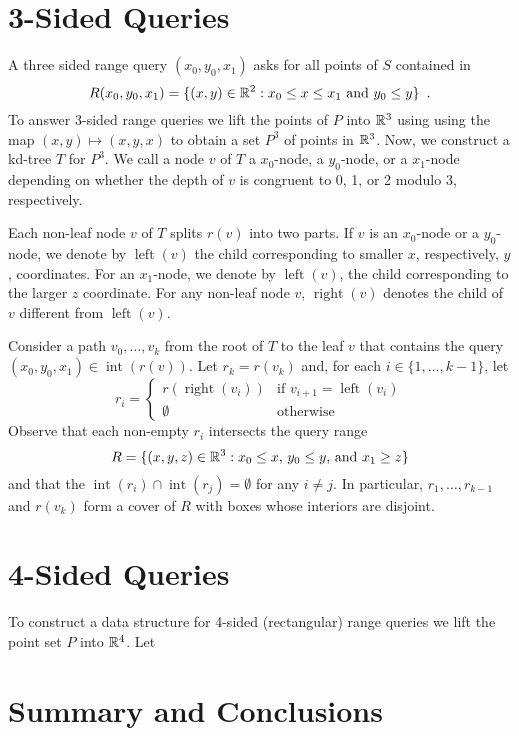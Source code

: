 \documentclass{patmorin}
\DeclareMathOperator{\interior}{int}
\DeclareMathOperator{\lft}{left}
\DeclareMathOperator{\rght}{right}
\begin{document}
\section{3-Sided Queries}

A three sided range query $(x_0,y_0,x_1)$ asks for all points of $S$
contained in
\[
   R(x_0,y_0,x_1) = \{ (x,y)\in\mathbb{R}^2 
                       : \mbox{$x_0\le x\le x_1$ and $y_0 \le y$} \} \enspace .
\]
To answer 3-sided range queries we lift the points of $P$ into $\mathbb{R}^3$
using using the map $(x,y) \mapsto (x,y,x)$ to obtain a set $P^3$
of points in $\mathbb{R}^3$.  Now, we construct a kd-tree $T$ for $P^3$.
We call a node $v$ of $T$ a $x_0$-node, a $y_0$-node, or a $x_1$-node
depending on whether the depth of $v$ is congruent to 0, 1, or 2 modulo
3, respectively.

Each non-leaf node $v$ of $T$ splits $r(v)$ into two parts.  If $v$ is an
$x_0$-node or a $y_0$-node, we denote by $\lft(v)$ the child corresponding to
smaller $x$, respectively, $y$, coordinates. For an $x_1$-node, we denote
by $\lft(v)$, the child corresponding to the larger $z$ coordinate.  For
any non-leaf node $v$, $\rght(v)$ denotes the child of $v$ different from
$\lft(v)$.

Consider a path $v_0,\ldots,v_k$ from the root of $T$ to the leaf $v$ that
contains the query $(x_0,y_0,x_1)\in\interior(r(v))$.  Let $r_k=r(v_k)$
and, for each $i\in\{1,\ldots,k-1\}$, let
\[
  r_i = \left\{\begin{array}{ll}
          r(\rght(v_i)) & \mbox{if $v_{i+1}=\lft(v_i)$} \\
          \emptyset     & \mbox{otherwise}
        \end{array}\right.
\]
Observe that each non-empty $r_i$ intersects the query range
\[
    R=\{ (x,y,z)\in\mathbb{R}^3 
          : \mbox{$x_0 \le x$, $y_0 \le y$, and $x_1 \ge z$} \}
\]
and that the $\interior(r_i)\cap \interior(r_j)=\emptyset$ for any $i\neq
j$.  In particular, $r_1,\ldots,r_{k-1}$ and $r(v_k)$ form a cover of $R$
with boxes whose interiors are disjoint.



\section{4-Sided Queries}

To construct a data structure for 4-sided (rectangular) range queries we
lift the point set $P$ into $\mathbb{R}^4$.  Let 

\section{Summary and Conclusions}
\end{document}
